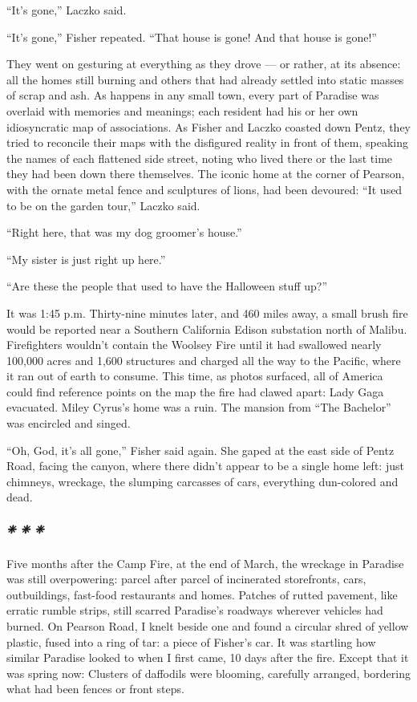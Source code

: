 ``It's gone,'' Laczko said.

``It's gone,'' Fisher repeated. ``That house is gone! And that house is
gone!''

They went on gesturing at everything as they drove --- or rather, at its
absence: all the homes still burning and others that had already settled
into static masses of scrap and ash. As happens in any small town, every
part of Paradise was overlaid with memories and meanings; each resident
had his or her own idiosyncratic map of associations. As Fisher and
Laczko coasted down Pentz, they tried to reconcile their maps with the
disfigured reality in front of them, speaking the names of each
flattened side street, noting who lived there or the last time they had
been down there themselves. The iconic home at the corner of Pearson,
with the ornate metal fence and sculptures of lions, had been devoured:
``It used to be on the garden tour,'' Laczko said.

``Right here, that was my dog groomer's house.''

``My sister is just right up here.''

``Are these the people that used to have the Halloween stuff up?''

It was 1:45 p.m. Thirty-nine minutes later, and 460 miles away, a small
brush fire would be reported near a Southern California Edison
substation north of Malibu. Firefighters wouldn't contain the Woolsey
Fire until it had swallowed nearly 100,000 acres and 1,600 structures
and charged all the way to the Pacific, where it ran out of earth to
consume. This time, as photos surfaced, all of America could find
reference points on the map the fire had clawed apart: Lady Gaga
evacuated. Miley Cyrus's home was a ruin. The mansion from ``The
Bachelor'' was encircled and singed.

``Oh, God, it's all gone,'' Fisher said again. She gaped at the east
side of Pentz Road, facing the canyon, where there didn't appear to be a
single home left: just chimneys, wreckage, the slumping carcasses of
cars, everything dun-colored and dead.

\hypertarget{---12}{%
\subparagraph{❈ ❈ ❈}\label{---12}}

Five months after the Camp Fire, at the end of March, the wreckage in
Paradise was still overpowering: parcel after parcel of incinerated
storefronts, cars, outbuildings, fast-food restaurants and homes.
Patches of rutted pavement, like erratic rumble strips, still scarred
Paradise's roadways wherever vehicles had burned. On Pearson Road, I
knelt beside one and found a circular shred of yellow plastic, fused
into a ring of tar: a piece of Fisher's car. It was startling how
similar Paradise looked to when I first came, 10 days after the fire.
Except that it was spring now: Clusters of daffodils were blooming,
carefully arranged, bordering what had been fences or front steps.

